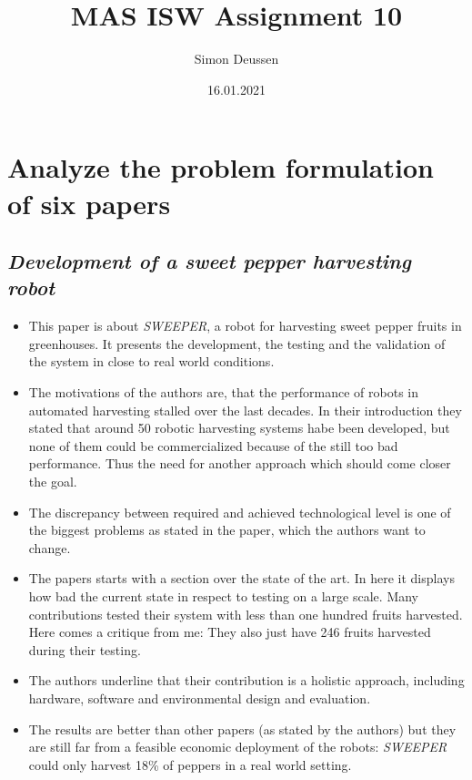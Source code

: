 \documentclass{article}
\title{MAS ISW Assignment 10}
\date{16.01.2021}
\author{Simon Deussen}
\begin{document}
\maketitle
{}

\section*{Analyze the problem formulation of six papers}

\subsection*{\emph{Development of a sweet pepper harvesting robot}}
\cite{Arad2020}

\begin{itemize}
  \item This paper is about \emph{SWEEPER}, a robot for harvesting sweet pepper fruits in greenhouses. It presents the development, the testing and the validation of the system in close to real world conditions.
  \item The motivations of the authors are, that the performance of robots in automated harvesting stalled over the last decades. In their introduction they stated that around 50 robotic harvesting systems habe been developed, but none of them could be commercialized because of the still too bad performance. Thus the need for another approach which should come closer the goal.
  \item The discrepancy between required and achieved technological level is one of the biggest problems as stated in the paper, which the authors want to change.
  \item The papers starts with a section over the state of the art. In here it displays how bad the current state in respect to testing on a large scale. Many contributions tested their system with less than one hundred fruits harvested. Here comes a critique from me: They also just have 246 fruits harvested during their testing.
  \item The authors underline that their contribution is a holistic approach, including hardware, software and environmental design and evaluation. 
  \item The results are better than other papers (as stated by the authors) but they are still far from a feasible economic deployment of the robots: \emph{SWEEPER} could only harvest 18\% of peppers in a real world setting.
\end{itemize}
\end{document}

